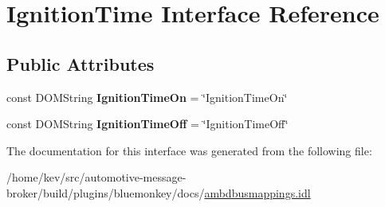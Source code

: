 \hypertarget{interfaceIgnitionTime}{\section{Ignition\+Time Interface Reference}
\label{interfaceIgnitionTime}
}
\subsection*{Public Attributes}
\begin{DoxyCompactItemize}
\item 
\hypertarget{interfaceIgnitionTime_a8b060c116de69b2b2faa7bc804de20ea}{const D\+O\+M\+String {\bfseries Ignition\+Time\+On} = \char`\"{}Ignition\+Time\+On\char`\"{}}\label{interfaceIgnitionTime_a8b060c116de69b2b2faa7bc804de20ea}

\item 
\hypertarget{interfaceIgnitionTime_a41d63201cf659eb7c74fd1df0660950f}{const D\+O\+M\+String {\bfseries Ignition\+Time\+Off} = \char`\"{}Ignition\+Time\+Off\char`\"{}}\label{interfaceIgnitionTime_a41d63201cf659eb7c74fd1df0660950f}

\end{DoxyCompactItemize}


The documentation for this interface was generated from the following file\+:\begin{DoxyCompactItemize}
\item 
/home/kev/src/automotive-\/message-\/broker/build/plugins/bluemonkey/docs/\hyperlink{ambdbusmappings_8idl}{ambdbusmappings.\+idl}\end{DoxyCompactItemize}
